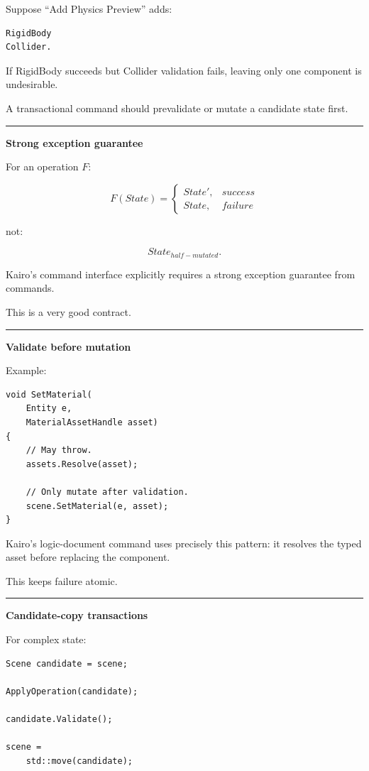 Suppose ``Add Physics Preview'' adds:

\begin{verbatim}
RigidBody
Collider.
\end{verbatim}

If RigidBody succeeds but Collider validation fails, leaving only one component is undesirable.

A transactional command should prevalidate or mutate a candidate state first.

\begin{center}\rule{0.5\linewidth}{0.5pt}\end{center}

\textbf{Strong exception guarantee}

For an operation \(F\):

\[
F(State)=
\begin{cases}
State',&success\\
State,&failure
\end{cases}
\]

not:

\[
State_{half-mutated}.
\]

Kairo's command interface explicitly requires a strong exception guarantee from commands.

This is a very good contract.

\begin{center}\rule{0.5\linewidth}{0.5pt}\end{center}

\textbf{Validate before mutation}

Example:

\begin{verbatim}
void SetMaterial(
    Entity e,
    MaterialAssetHandle asset)
{
    // May throw.
    assets.Resolve(asset);

    // Only mutate after validation.
    scene.SetMaterial(e, asset);
}
\end{verbatim}

Kairo's logic-document command uses precisely this pattern: it resolves the typed asset before replacing the component.

This keeps failure atomic.

\begin{center}\rule{0.5\linewidth}{0.5pt}\end{center}

\textbf{Candidate-copy transactions}

For complex state:

\begin{verbatim}
Scene candidate = scene;

ApplyOperation(candidate);

candidate.Validate();

scene =
    std::move(candidate);
\end{verbatim}


